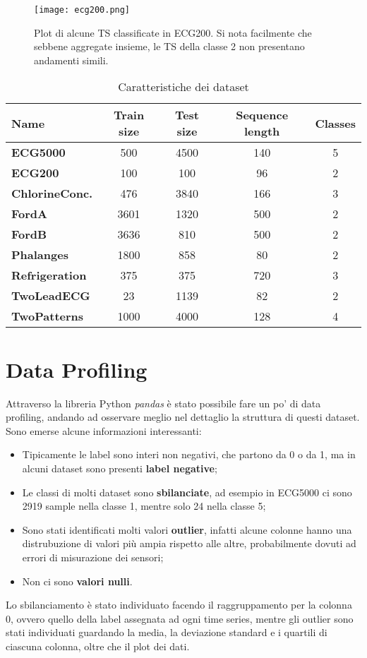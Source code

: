 \begin{figure}[t]
	\centering
	\texttt{[image: ecg200.png]}
	\caption{Plot di alcune TS classificate in ECG200. Si nota facilmente che sebbene aggregate insieme, le TS della classe 2 non presentano andamenti simili.}
	\label{fig:ecg200}
\end{figure}

\begin{table}[H]
	\centering
	\begin{tabularx}{\textwidth}{X c c c c}
		\hline
		\textbf{Name} & \textbf{Train size} & \textbf{Test size} & \textbf{Sequence length} & \textbf{Classes} \\
		\hline
		\textbf{ECG5000} & 500 & 4500 & 140 & 5\\
		\textbf{ECG200} & 100 & 100 & 96 & 2\\
		\textbf{ChlorineConc.} & 476 & 3840 & 166 & 3\\
		\textbf{FordA} & 3601 & 1320 & 500 & 2\\
		\textbf{FordB} & 3636 & 810 & 500 & 2\\
		\textbf{Phalanges} & 1800 & 858 & 80 & 2\\
		\textbf{Refrigeration} & 375 & 375 & 720 & 3\\
		\textbf{TwoLeadECG} & 23 & 1139 & 82 & 2\\
		\textbf{TwoPatterns} & 1000 & 4000 & 128 & 4\\
	\end{tabularx}
	\caption{Caratteristiche dei dataset}
	\label{tab:datasets}
\end{table}

\section{Data Profiling}
Attraverso la libreria Python \textit{pandas} è stato possibile fare un po' di data profiling, andando ad osservare meglio nel dettaglio la struttura di questi dataset.\\
Sono emerse alcune informazioni interessanti:
\begin{itemize}
	\item Tipicamente le label sono interi non negativi, che partono da 0 o da 1, ma in alcuni dataset sono presenti \textbf{label negative};
	\item Le classi di molti dataset sono \textbf{sbilanciate}, ad esempio in ECG5000 ci sono 2919 sample nella classe 1, mentre solo 24 nella classe 5;
	\item Sono stati identificati molti valori \textbf{outlier}, infatti alcune colonne hanno una distrubuzione di valori più ampia rispetto alle altre, probabilmente dovuti ad errori di misurazione dei sensori;
	\item Non ci sono \textbf{valori nulli}.
\end{itemize}
Lo sbilanciamento è stato individuato facendo il raggruppamento per la colonna 0, ovvero quello della label assegnata ad ogni time series, mentre gli outlier sono stati individuati guardando la media, la deviazione standard e i quartili di ciascuna colonna, oltre che il plot dei dati.\\

